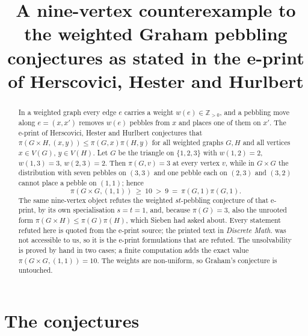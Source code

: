 \documentclass[11pt]{amsart}
\title[A weighted triangle squared]
{A nine-vertex counterexample to the weighted Graham pebbling conjectures
as stated in the e-print of Herscovici, Hester and Hurlbert}
\date{}
\theoremstyle{definition}
\begin{document}
\begin{abstract}
In a weighted graph every edge $e$ carries a weight $w(e)\in\mathbb Z_{>0}$,
and a pebbling move along $e=(x,x')$ removes $w(e)$ pebbles from $x$ and
places one of them on $x'$. The e-print of Herscovici, Hester and Hurlbert
conjectures that $\pi(G\times H,(x,y))\le\pi(G,x)\pi(H,y)$ for all weighted
graphs $G,H$ and all vertices $x\in V(G)$, $y\in V(H)$. Let $G$ be the
triangle on
$\{1,2,3\}$ with $w(1,2)=2$, $w(1,3)=3$, $w(2,3)=2$. Then $\pi(G,v)=3$ at
every vertex $v$, while in $G\times G$ the distribution with seven pebbles on
$(3,3)$ and one pebble each on $(2,3)$ and $(3,2)$ cannot place a pebble on
$(1,1)$; hence
\[
  \pi(G\times G,(1,1))\ \ge\ 10\ >\ 9\ =\ \pi(G,1)\pi(G,1).
\]
The same nine-vertex object refutes the weighted
$st$-pebbling conjecture of that e-print, by its own specialisation $s=t=1$,
and, because $\pi(G)=3$, also the unrooted form $\pi(G\times
H)\le\pi(G)\pi(H)$, which Sieben had asked about. Every statement refuted
here is quoted from the e-print source; the printed text in \emph{Discrete
Math.} was not accessible to us, so it is the e-print formulations that are
refuted. The unsolvability is proved by hand in two cases; a finite
computation adds the exact value $\pi(G\times G,(1,1))=10$. The weights are
non-uniform, so Graham's conjecture is untouched.
\end{abstract}

\maketitle

\section{The conjectures}
\end{document}
